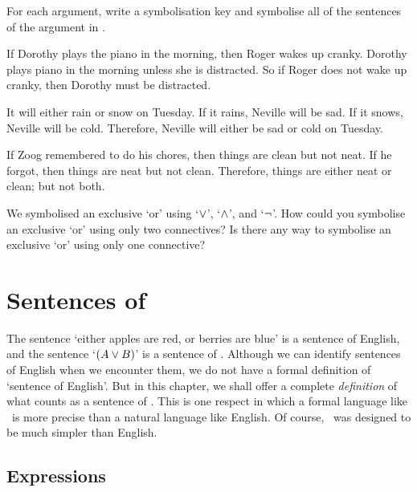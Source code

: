 \problempart
For each argument, write a symbolisation key and symbolise all of the sentences of the argument in \TFL.
\begin{earg}
\item If Dorothy plays the piano in the morning, then Roger wakes up cranky. Dorothy plays piano in the morning unless she is distracted. So if Roger does not wake up cranky, then Dorothy must be distracted.
\item It will either rain or snow on Tuesday. If it rains, Neville will be sad. If it snows, Neville will be cold. Therefore, Neville will either be sad or cold on Tuesday.
\item If Zoog remembered to do his chores, then things are clean but not neat. If he forgot, then things are neat but not clean. Therefore, things are either neat or clean; but not both.
\end{earg}

\problempart
We symbolised an exclusive `or' using `$\vee$', `$\wedge$', and `$\neg$'. How could you symbolise an exclusive `or' using only two connectives? Is there any way to symbolise an exclusive `or' using only one connective?


\chapter{Sentences of \textnormal{\TFL}}\label{s:TFLSentences}
The sentence `either apples are red, or berries are blue' is a sentence of English, and the sentence `$(A\vee B)$' is a sentence of \TFL. Although we can identify sentences of English when we encounter them, we do not have a formal definition of `sentence of English'. But in this chapter, we shall offer a complete \emph{definition} of what counts as a sentence of \TFL. This is one respect in which a formal language like \TFL\ is more precise than a natural language like English. Of course, \TFL\ was designed to be  much simpler than English.


\section{Expressions}

